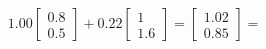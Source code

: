 \documentclass[preview]{standalone}
\begin{document}
\begin{align*}
1.00 \begin{bmatrix} 0.8 \\ 0.5 \end{bmatrix} + 0.22 \begin{bmatrix} 1 \\ 1.6 \end{bmatrix} = \begin{bmatrix} 1.02 \\ 0.85 \end{bmatrix} =
\end{align*}
\end{document}
